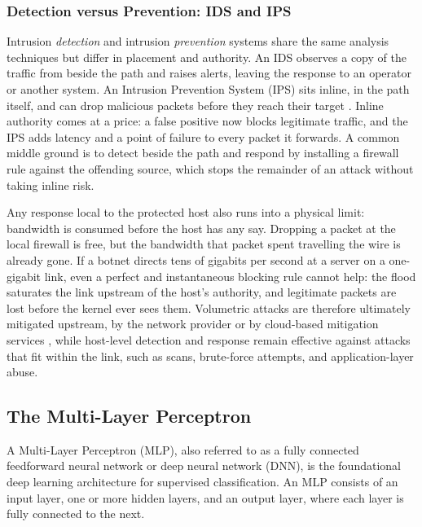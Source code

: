 \subsubsection{Detection versus Prevention: IDS and IPS}
\label{subsec:ids_vs_ips}

\par Intrusion \emph{detection} and intrusion \emph{prevention} systems share the same analysis techniques but differ in placement and authority. An IDS observes a copy of the traffic from beside the path and raises alerts, leaving the response to an operator or another system. An Intrusion Prevention System (IPS) sits inline, in the path itself, and can drop malicious packets before they reach their target \cite{FortinetIPS}. Inline authority comes at a price: a false positive now blocks legitimate traffic, and the IPS adds latency and a point of failure to every packet it forwards. A common middle ground is to detect beside the path and respond by installing a firewall rule against the offending source, which stops the remainder of an attack without taking inline risk.

\par Any response local to the protected host also runs into a physical limit: bandwidth is consumed before the host has any say. Dropping a packet at the local firewall is free, but the bandwidth that packet spent travelling the wire is already gone. If a botnet directs tens of gigabits per second at a server on a one-gigabit link, even a perfect and instantaneous blocking rule cannot help: the flood saturates the link upstream of the host's authority, and legitimate packets are lost before the kernel ever sees them. Volumetric attacks are therefore ultimately mitigated upstream, by the network provider or by cloud-based mitigation services \cite{CloudflareDDoS}, while host-level detection and response remain effective against attacks that fit within the link, such as scans, brute-force attempts, and application-layer abuse.

\subsection{The Multi-Layer Perceptron}
\label{subsec:mlp}

\par A Multi-Layer Perceptron (MLP), also referred to as a fully connected feedforward neural network or deep neural network (DNN), is the foundational deep learning architecture for supervised classification. An MLP consists of an input layer, one or more hidden layers, and an output layer, where each layer is fully connected to the next.

